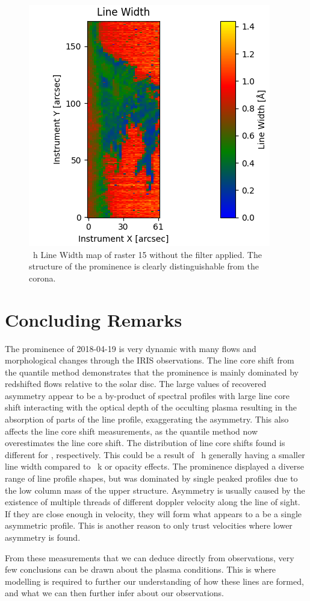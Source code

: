 \begin{figure}
    \centering
    \includegraphics[width=0.5\linewidth]{./01Observations/figs/20180419/fwhmex.png} 
    \caption{\mgii~h Line Width map of raster 15 without the filter applied. The structure of the prominence is clearly distinguishable from the corona.}
    \label{fwhmex}
\end{figure}
\section{Concluding Remarks}

The prominence of 2018-04-19 is very dynamic with many flows and morphological changes through the IRIS observations. The line core shift from the quantile method demonstrates that the prominence is mainly dominated by redshifted flows relative to the solar disc. The large values of recovered asymmetry appear to be a by-product of spectral profiles with large line core shift interacting with the optical depth of the occulting plasma resulting in the absorption of parts of the line profile, exaggerating the asymmetry. This also affects the line core shift measurements, as the quantile method now overestimates the line core shift. The distribution of line core shifts found is different for \mgiihk{}, respectively.  This could be a result of \mgii~h generally having a smaller line width compared to \mgii~k or opacity effects. The prominence displayed a diverse range of line profile shapes, but was dominated by single peaked profiles due to the low column mass of the upper structure. Asymmetry is usually caused by the existence of multiple threads of different doppler velocity along the line of sight. If they are close enough in velocity, they will form what appears to a be a single asymmetric profile. This is another reason to only trust velocities where lower asymmetry is found. 

From these measurements that we can deduce directly from observations, very few conclusions can be drawn about the plasma conditions. This is where modelling is required to further our understanding of how these lines are formed, and what we can then further infer about our observations. 